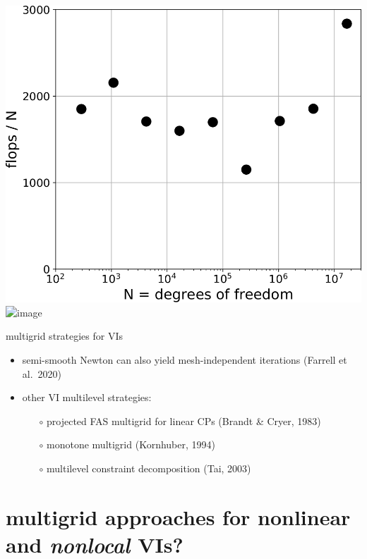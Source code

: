 \documentclass[svgnames,
               hyperref={colorlinks,citecolor=DeepPink4,linkcolor=FireBrick,urlcolor=Maroon},
               usepdftitle=false]  %
               {beamer}
\begin{document}
\begin{frame}[fragile]
\vspace{-22mm}
\hspace{40mm} \includegraphics[height=0.45\textheight]{images/obstacle-flops-per-n.png} \qquad \includegraphics<2>[width=20mm]{images/frontcover.jpg}
\end{frame}


\begin{frame}{multigrid strategies for VIs}

\begin{itemize}
\item semi-smooth Newton can also yield mesh-independent iterations (Farrell et al.~2020)
\item other VI multilevel strategies:
    \begin{itemize}
    \item[$\circ$] projected FAS multigrid for linear CPs (Brandt \& Cryer, 1983)
    \item[$\circ$] monotone multigrid (Kornhuber, 1994)
    \item[$\circ$] multilevel constraint decomposition (Tai, 2003)
    \end{itemize}
\end{itemize}
\end{frame}


\section{multigrid approaches for nonlinear and \emph{nonlocal} VIs?}
\end{document}

